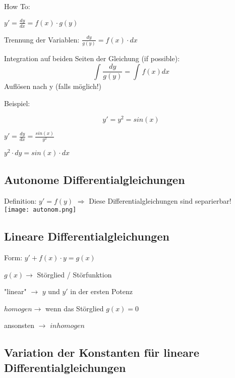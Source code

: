 \begin{multicols*}{3}
    {How To:}

    $y' = \frac{dy}{dx} = f(x)\cdot g(y) $

     {Trennung der Variablen:} $\frac{dy}{g(y)} = f(x)\cdot dx$

     {Integration auf beiden Seiten der Gleichung (if possible):} $$\int_{}^{}{\frac{dy}{g(y)}=\int_{}^{}f(x)dx}$$
     {Auflösen nach y (falls möglich!)}

    \begin{multicols}{2}
        {Beispiel:}

        $$y' = y^2 = sin(x)$$

         $y' = \frac{dy}{dx}=\frac{sin(x)}{y^2}$

         $y^2\cdot dy = sin(x)\cdot dx $
        \columnbreak



    \end{multicols}



    \subsection{Autonome Differentialgleichungen}
    {Definition: $y' = f(y)$}
    {$\Rightarrow$ Diese Differentialgleichungen sind separierbar!}
    \texttt{[image: autonom.png]}
    \vfill\null
    \columnbreak
    \subsection{ Lineare Differentialgleichungen}
    {\large Form: $y' + f(x) \cdot y = g(x)$}

    {$g(x) \rightarrow$ Störglied / Störfunktion}

    { "linear" $\rightarrow$ $y$ und $y'$ in der ersten Potenz}

    { $homogen \rightarrow$ wenn das Störglied  $g(x)=0$}

    { ansonsten $\rightarrow$ $inhomogen$}

    \subsection{ Variation der Konstanten für lineare Differentialgleichungen}



\end{multicols*}
